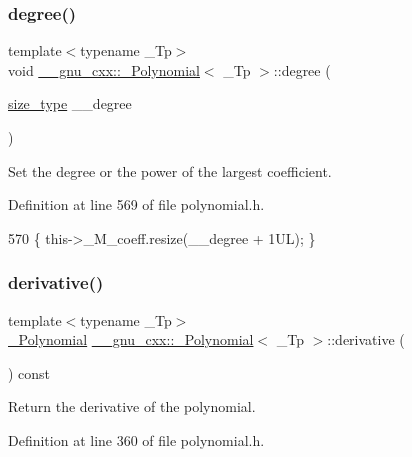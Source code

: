 \subsubsection{\texorpdfstring{degree()}{degree()}\hspace{0.1cm}{\footnotesize\ttfamily [2/2]}}
{\footnotesize\ttfamily template$<$typename \+\_\+\+Tp$>$ \\
void \hyperlink{class____gnu__cxx_1_1__Polynomial}{\+\_\+\+\_\+gnu\+\_\+cxx\+::\+\_\+\+Polynomial}$<$ \+\_\+\+Tp $>$\+::degree (\begin{DoxyParamCaption}\item[{\hyperlink{class____gnu__cxx_1_1__Polynomial_a6afe219c123c7a2fdc5abac8a6639053}{size\+\_\+type}}]{\+\_\+\+\_\+degree }\end{DoxyParamCaption})\hspace{0.3cm}{\ttfamily [inline]}}

Set the degree or the power of the largest coefficient. 

Definition at line 569 of file polynomial.\+h.


\begin{DoxyCode}
570       \{ this->\_M\_coeff.resize(\_\_degree + 1UL); \}
\end{DoxyCode}
\mbox{\label{class____gnu__cxx_1_1__Polynomial_a69e973ccaf5857251a8b7971e19a5ec7}} 
\subsubsection{\texorpdfstring{derivative()}{derivative()}}
{\footnotesize\ttfamily template$<$typename \+\_\+\+Tp$>$ \\
\hyperlink{class____gnu__cxx_1_1__Polynomial}{\+\_\+\+Polynomial} \hyperlink{class____gnu__cxx_1_1__Polynomial}{\+\_\+\+\_\+gnu\+\_\+cxx\+::\+\_\+\+Polynomial}$<$ \+\_\+\+Tp $>$\+::derivative (\begin{DoxyParamCaption}{ }\end{DoxyParamCaption}) const\hspace{0.3cm}{\ttfamily [inline]}}

Return the derivative of the polynomial. 

Definition at line 360 of file polynomial.\+h.


